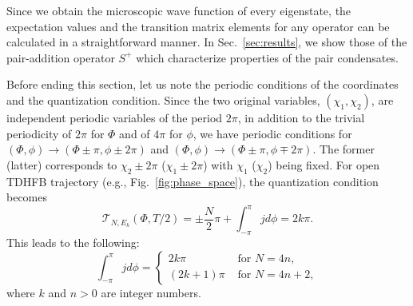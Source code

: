 \documentclass[%
superscriptaddress,
preprint,
showpacs,
nofootinbib,
amsmath,amssymb,
prc,
floatfix ]%
{revtex4-1}
\begin{document}
Since we obtain the microscopic wave function of every eigenstate,
the expectation values and the transition matrix elements for any operator
can be calculated in a straightforward manner.
In Sec.~\ref{sec:results}, we show those of the pair-addition operator
$S^+$ which characterize properties of the pair condensates.

%

Before ending this section, let us note the periodic conditions
of the coordinates and the quantization condition.
Since the two original variables, $(\chi_1,\chi_2)$,
are independent periodic variables of the period $2\pi$,
in addition to the trivial periodicity of $2\pi$ for $\Phi$ and of $4\pi$
for $\phi$,
we have periodic conditions for
$(\Phi,\phi)\rightarrow (\Phi\pm \pi,\phi\pm 2\pi)$ and
$(\Phi,\phi)\rightarrow (\Phi\pm \pi,\phi\mp 2\pi)$.
The former (latter) corresponds to $\chi_2\pm 2\pi$ ($\chi_1\pm 2\pi$)
with $\chi_1$ ($\chi_2$) being fixed.
For open TDHFB trajectory (e.g., Fig.~\ref{fig:phase_space}),
the quantization condition becomes
\begin{equation}
 \mathcal{T}_{N,E_k}(\Phi,T/2)
	= \pm \frac{N}{2} \pi + \int_{-\pi}^\pi j d\phi
	= 2k\pi .
\end{equation}
This leads to the following:
\begin{equation}
	\int_{-\pi}^\pi j d\phi = 
	\begin{cases}
		2k\pi & \mbox{ for } N=4n ,\\
		(2k+1)\pi & \mbox{ for } N=4n+2 ,
	\end{cases}
	\label{EBK_2}
\end{equation}
where $k$ and $n>0$ are integer numbers.
\end{document}
